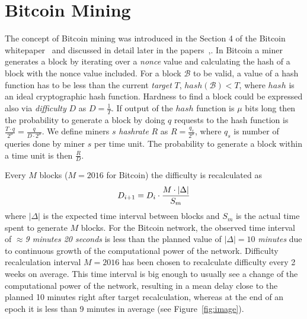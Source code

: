 \documentclass[]{llncs}
\newcommand{\texp}{|\Delta|}
\newcommand{\block}{\mathcal{B}}
\begin{document}
\section{Bitcoin Mining}
\label{sec:bit}

The concept of Bitcoin mining was introduced in the Section 4 of the Bitcoin whitepaper~\cite{Nakamoto2008} and discussed in detail later in the papers~\cite{kraft2015difficulty},\cite{gkl16}. In Bitcoin a miner generates a block by iterating over a {\em nonce} value and calculating the hash of a block with the nonce value included. For a block $\block$ to be valid, a value of a hash function has to be less than the current {\em target} $T$, $hash(\block) < T$, where $hash$ is an ideal cryptographic hash function. Hardness to find a block could be expressed also via {\em difficulty} $D$ as $D = \frac{1}{T}$. If output of the $hash$ function is $\mu$ bits long then the probability to generate a block by doing $q$ requests to the hash function is $\frac{T \cdot q}{2^\mu} = \frac{q}{D \cdot 2^\mu}$. We define miners $s$ \textit{hashrate} $R$ as $R = \frac{q_s}{2^\mu}$, where $q_s$ is number of queries done by miner $s$ per time unit. The probability to generate a block within a time unit is then $\frac{R}{D}$.


Every $M$ blocks ($M = 2016$ for Bitcoin) the difficulty is recalculated as
\begin{equation}
D_{i+1}=D_i \cdot {M \cdot \texp \over S_m}
\end{equation}
where $\texp$ is the expected time interval between blocks and $S_m$ is the actual time spent to generate $M$ blocks.
For the Bitcoin network, the observed time interval of $\approx${\em 9 minutes 20 seconds} is less than the planned value of $\texp = 10$ {\em minutes} due to continuous growth of the computational power of the network.
Difficulty recalculation interval $M=2016$ has been chosen to recalculate difficulty every 2 weeks on average.
This time interval is big enough to usually see a change of the computational power of the network, resulting in a mean delay close to the planned 10 minutes right after target recalculation, whereas at the end of an epoch it is less than 9 minutes in average (see Figure~\ref{fig:image}).
\end{document}
